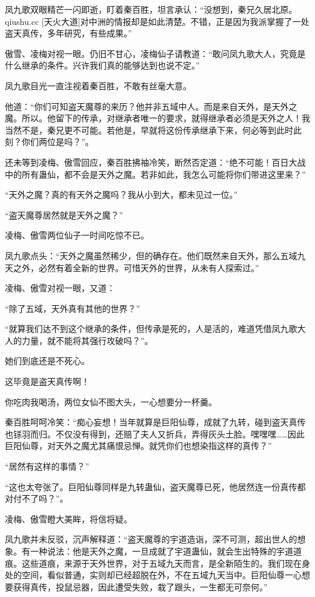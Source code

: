 \begin{this_body}
凤九歌双眼精芒一闪即逝，盯着秦百胜，坦言承认：“没想到，秦兄久居北原。qiushu.cc [天火大道]对中洲的情报却是如此清楚。不错，正是因为我派掌握了一处盗天真传，多年研究，有些成果。”

傲雪、凌梅对视一眼。仍旧不甘心，凌梅仙子请教道：“敢问凤九歌大人，究竟是什么继承的条件。兴许我们真的能够达到也说不定。”

凤九歌目光一直注视着秦百胜，不敢有丝毫大意。

他道：“你们可知盗天魔尊的来历？他并非五域中人。而是来自天外，是天外之魔。所以。他留下的传承，对继承者唯一的要求，就得继承者必须是天外之人！我当然不是，秦兄更不可能。若他是，早就将这份传承继承下来，何必等到此时此刻？你们两位是吗？”。

还未等到凌梅、傲雪回应，秦百胜拂袖冷笑，断然否定道：“绝不可能！百日大战中的所有蛊仙，都不会是天外之魔。若非如此，我怎么可能将你们带进这里来？”

“天外之魔？真的有天外之魔吗？我从小到大，都未见过一位。”

“盗天魔尊居然就是天外之魔？”

凌梅、傲雪两位仙子一时间吃惊不已。

凤九歌点头：“天外之魔虽然稀少，但的确存在。他们既然来自天外，那么五域九天之外，必然有着全新的世界。可惜天外的世界，从未有人探索过。”

凌梅、傲雪对视一眼，又道：

“除了五域，天外真有其他的世界？”

“就算我们达不到这个继承的条件，但传承是死的，人是活的，难道凭借凤九歌大人的力量，就不能将其强行攻破吗？”。

她们到底还是不死心。

这毕竟是盗天真传啊！

你吃肉我喝汤，两位女仙不图大头，一心想要分一杯羹。

秦百胜呵呵冷笑：“痴心妄想！当年就算是巨阳仙尊，成就了九转，碰到盗天真传也铩羽而归。不仅没有得到，还赔了夫人又折兵，弄得灰头土脸。嘿嘿嘿……因此巨阳仙尊，对天外之魔尤其痛恨忌惮。就凭你们也想染指这样的真传？”

“居然有这样的事情？”

“这也太夸张了。巨阳仙尊同样是九转蛊仙，盗天魔尊已死，他居然连一份真传都对付不了吗？”。

凌梅、傲雪瞪大美眸，将信将疑。

凤九歌并未反驳，沉声解释道：“盗天魔尊的宇道造诣，深不可测，超出世人的想象。有一种说法：他是天外之魔，一旦成就了宇道蛊仙，就会生出特殊的宇道道痕。这些道痕，来源于天外世界，对于五域九天而言，是全新陌生的。我们现在身处的空间，看似普通，实则却已经超脱在外，不在五域九天当中。巨阳仙尊一心想要获得真传，投鼠忌器，因此遭受失败，栽了跟头，一生都无可奈何。”


\end{this_body}
